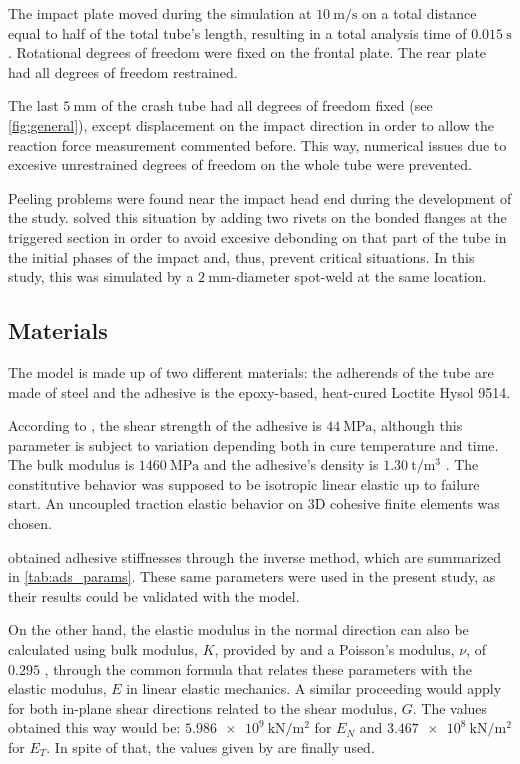 \documentclass[cmfonts]{witpress}
\begin{document}
The impact plate moved during the simulation at $\SI{10}{\m/\s}$ on a total distance equal to half of the total tube's length, resulting in a total analysis time of $\SI{0.015}{\s}$. Rotational degrees of freedom were fixed on the frontal plate. The rear plate had all degrees of freedom restrained.

The last $\SI{5}{\mm}$ of the crash tube had all degrees of freedom fixed (see \cref{fig:general}), except displacement on the impact direction in order to allow the reaction force measurement commented before. This way, numerical issues due to excesive unrestrained degrees of freedom on the whole tube were prevented.

Peeling problems were found near the impact head end during the development of the study. \cite{Peroni2009} solved this situation by adding two rivets on the bonded flanges at the triggered section in order to avoid excesive debonding on that part of the tube in the initial phases of the impact and, thus, prevent critical situations. In this study, this was simulated by a $\SI{2}{\mm}$-diameter spot-weld at the same location.

\subsection{Materials}

The model is made up of two different materials: the adherends of the tube are made of steel and the adhesive is the epoxy-based, heat-cured Loctite Hysol 9514.

According to \cite{manufCatalog}, the shear strength of the adhesive is $\SI{44}{\MPa}$, although this parameter is subject to variation depending both in cure temperature and time. The bulk modulus is $\SI{1460}{\MPa}$ and the adhesive's density is $\SI{1.30}{\tonne/\m^3}$ \cite{manufCatalog}. The constitutive behavior was supposed to be isotropic linear elastic \cite{SernaMoreno2015} up to failure start. An uncoupled traction elastic behavior \cite{Sadowski2010, Sadowski2011, Scattina2011, Sadowski2014} on 3D cohesive finite elements was chosen.

\cite{Scattina2011} obtained adhesive stiffnesses through the inverse method, which are summarized in \cref{tab:ads_params}. These same parameters were used in the present study, as their results could be validated with the model.

On the other hand, the elastic modulus in the normal direction can also be calculated using bulk modulus, $K$, provided by \cite{manufCatalog} and a Poisson's modulus, $\nu$, of $\num{0.295}$ \cite{JDiaz}, through the common formula that relates these parameters with the elastic modulus, $E$ in linear elastic mechanics. A similar proceeding would apply for both in-plane shear directions related to the shear modulus, $G$. The values obtained this way would be: $\SI{5.986e9}{\kN/\m^2}$ for $E_{N}$ and $\SI{3.467e8}{\kN/\m^2}$ for $E_{T}$. In spite of that, the values given by \cite{Scattina2011} are finally used.
\end{document}
